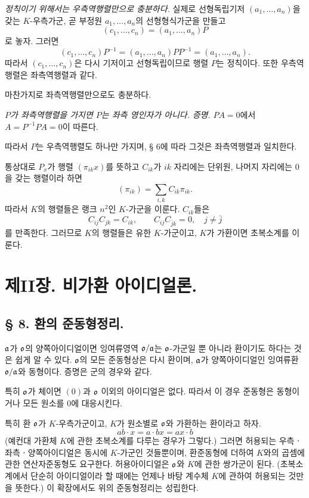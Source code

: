 \emph{정칙이기 위해서는 우측역행렬만으로 충분하다.} 실제로 선형독립기저 \((a_1,\ldots,a_n)\)을 갖는 \(K\)-우측가군, 곧 부정원 \(a_1,\ldots,a_n\)의 선형형식가군을 만들고
\[
        (c_1,\ldots,c_n)=(a_1,\ldots,a_n)P
\]
로 놓자. 그러면
\[
        (c_1,\ldots,c_n)P^{-1}
        =(a_1,\ldots,a_n)PP^{-1}
        =(a_1,\ldots,a_n).
\]
따라서 \((c_1,\ldots,c_n)\)은 다시 기저이고 선형독립이므로 행렬 \(P\)는 정칙이다. 또한 우측역행렬은 좌측역행렬과 같다.

마찬가지로 좌측역행렬만으로도 충분하다.

\emph{\(P\)가 좌측역행렬을 가지면 \(P\)는 좌측 영인자가 아니다.}
\emph{증명.} \(PA=0\)에서 \(A=P^{-1}PA=0\)이 따른다.

따라서 \(P\)는 우측역행렬도 하나만 가지며, § 6에 따라 그것은 좌측역행렬과 일치한다.

통상대로 \(P_x\)가 행렬 \((\pi_{ik}x)\)를 뜻하고 \(C_{ik}\)가 \(ik\) 자리에는 단위원, 나머지 자리에는 0을 갖는 행렬이라 하면
\[
        (\pi_{ik})=\sum_{i,k}C_{ik}\pi_{ik}.
\]
따라서 \(K\)의 행렬들은 랭크 \(n^2\)인 \(K\)-가군을 이룬다. \(C_{ik}\)들은
\[
        C_{ij}C_{jk}=C_{ik},
        \qquad
        C_{ij}C_{\bar j k}=0,\quad j\ne\bar j
\]
를 만족한다. 그러므로 \(K\)의 행렬들은 유한 \(K\)-가군이고, \(K\)가 가환이면 초복소계를 이룬다.

\section*{제II장. 비가환 아이디얼론.}

\subsection*{§ 8. 환의 준동형정리.}

\(\mathfrak{a}\)가 \(\mathfrak o\)의 양쪽아이디얼이면 잉여류영역 \(\mathfrak o/\mathfrak{a}\)는 \(\mathfrak o\)-가군일 뿐 아니라 환이기도 하다는 것은 쉽게 알 수 있다. \(\mathfrak o\)의 모든 준동형상은 다시 환이며, \(\mathfrak{a}\)가 양쪽아이디얼인 잉여류환 \(\mathfrak o/\mathfrak{a}\)와 동형이다. 증명은 군의 경우와 같다.

특히 \(\mathfrak o\)가 체이면 \((0)\)과 \(\mathfrak o\) 이외의 아이디얼은 없다. 따라서 이 경우 준동형은 동형이거나 모든 원소를 0에 대응시킨다.

특히 환 \(\mathfrak o\)가 \(K\)-우측가군이고, \(K\)가 원소별로 \(\mathfrak o\)와 가환하는 환이라고 하자.
\[
        ab\cdot x=a\cdot bx=ax\cdot b
\]
(예컨대 가환체 \(K\)에 관한 초복소계를 다루는 경우가 그렇다.) 그러면 허용되는 우측ㆍ좌측ㆍ양쪽아이디얼은 동시에 \(K\)-가군인 것들뿐이며, 환준동형에 더하여 \(K\)와의 곱셈에 관한 연산자준동형도 요구한다. 허용아이디얼은 \(\mathfrak o\)와 \(K\)에 관한 쌍가군이 된다. (초복소계에서 단순히 \glqq{}아이디얼\grqq{}이라 할 때에는 언제나 바탕 계수체 \(K\)에 관하여 허용되는 것만을 뜻한다.) 이 확장에서도 위의 준동형정리는 성립한다.

